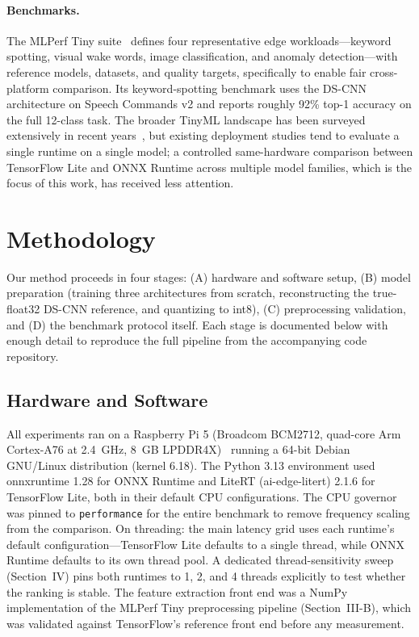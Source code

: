 \documentclass[conference,a4paper]{IEEEtran}
\begin{document}
\paragraph{Benchmarks.}
The MLPerf Tiny suite~\cite{banbury2021mlperftiny} defines four representative edge workloads---keyword spotting, visual wake words, image classification, and anomaly detection---with reference models, datasets, and quality targets, specifically to enable fair cross-platform comparison. Its keyword-spotting benchmark uses the DS-CNN architecture on Speech Commands v2 and reports roughly 92\% top-1 accuracy on the full 12-class task. The broader TinyML landscape has been surveyed extensively in recent years~\cite{rajapakse2023tinyml,capogrosso2023tinymlsurvey,kallimani2023tinyml}, but existing deployment studies tend to evaluate a single runtime on a single model; a controlled same-hardware comparison between TensorFlow Lite and ONNX Runtime across multiple model families, which is the focus of this work, has received less attention.

\section{Methodology}

Our method proceeds in four stages: (A) hardware and software setup, (B) model preparation (training three architectures from scratch, reconstructing the true-float32 DS-CNN reference, and quantizing to int8), (C) preprocessing validation, and (D) the benchmark protocol itself. Each stage is documented below with enough detail to reproduce the full pipeline from the accompanying code repository.

\subsection{Hardware and Software}

All experiments ran on a Raspberry Pi 5 (Broadcom BCM2712, quad-core Arm Cortex-A76 at 2.4~GHz, 8~GB LPDDR4X)~\cite{raspberrypi5} running a 64-bit Debian GNU/Linux distribution (kernel 6.18). The Python 3.13 environment used onnxruntime 1.28 for ONNX Runtime and LiteRT (ai-edge-litert) 2.1.6 for TensorFlow Lite, both in their default CPU configurations. The CPU governor was pinned to \texttt{performance} for the entire benchmark to remove frequency scaling from the comparison. On threading: the main latency grid uses each runtime's default configuration---TensorFlow Lite defaults to a single thread, while ONNX Runtime defaults to its own thread pool. A dedicated thread-sensitivity sweep (Section~IV) pins both runtimes to 1, 2, and 4 threads explicitly to test whether the ranking is stable. The feature extraction front end was a NumPy implementation of the MLPerf Tiny preprocessing pipeline (Section~III-B), which was validated against TensorFlow's reference front end before any measurement.
\end{document}
